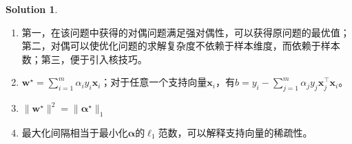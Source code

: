 \documentclass[a4paper,UTF8]{article}
\theoremstyle{definition}
\newtheorem*{solution}{Solution}
\begin{document}
\begin{solution}
\begin{enumerate}[(1)]
\item 第一，在该问题中获得的对偶问题满足强对偶性，可以获得原问题的最优值；第二，对偶可以使优化问题的求解复杂度不依赖于样本维度，而依赖于样本数；第三，便于引入核技巧。
\item $\mathbf{w}^\star=\sum_{i=1}^{m}\alpha_i y_i\mathbf{x}_i$；对于任意一个支持向量$\mathbf{x}_i$，有$b=y_i-\sum_{j=1}^{m}\alpha_j y_j\mathbf{x}_j^\top\mathbf{x}_i$。
\item $\|\mathbf{w}^\star\|^2=\|\bm{\alpha}^\star\|_1$
\item 最大化间隔相当于最小化$\bm{\alpha}$的$\ell_1$范数，可以解释支持向量的稀疏性。

\end{enumerate}
\end{solution}
\end{document}
